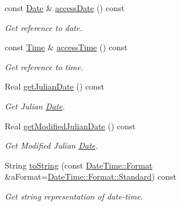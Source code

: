 \begin{DoxyCompactItemize}
const \hyperlink{classlibrary_1_1physics_1_1time_1_1_date}{Date} \& \hyperlink{classlibrary_1_1physics_1_1time_1_1_date_time_aa5042ece04c5b9accf745dbd26ecb0b4}{access\+Date} () const
\begin{DoxyCompactList}\small\item\em Get reference to date. \end{DoxyCompactList}\item 
const \hyperlink{classlibrary_1_1physics_1_1time_1_1_time}{Time} \& \hyperlink{classlibrary_1_1physics_1_1time_1_1_date_time_af3ba24f0db227e42120f022facb6e759}{access\+Time} () const
\begin{DoxyCompactList}\small\item\em Get reference to time. \end{DoxyCompactList}\item 
Real \hyperlink{classlibrary_1_1physics_1_1time_1_1_date_time_aea64945314a4dd75f0f8fd0fea9c5c33}{get\+Julian\+Date} () const
\begin{DoxyCompactList}\small\item\em Get Julian \hyperlink{classlibrary_1_1physics_1_1time_1_1_date}{Date}. \end{DoxyCompactList}\item 
Real \hyperlink{classlibrary_1_1physics_1_1time_1_1_date_time_a9c624dbbdd13c81d96f0492eae0d1e2f}{get\+Modified\+Julian\+Date} () const
\begin{DoxyCompactList}\small\item\em Get Modified Julian \hyperlink{classlibrary_1_1physics_1_1time_1_1_date}{Date}. \end{DoxyCompactList}\item 
String \hyperlink{classlibrary_1_1physics_1_1time_1_1_date_time_a6881a196eb787e0d5206005e31041e7e}{to\+String} (const \hyperlink{classlibrary_1_1physics_1_1time_1_1_date_time_a99e6afd988c9b091b1540d707922c804}{Date\+Time\+::\+Format} \&a\+Format=\hyperlink{classlibrary_1_1physics_1_1time_1_1_date_time_a99e6afd988c9b091b1540d707922c804aeb6d8ae6f20283755b339c0dc273988b}{Date\+Time\+::\+Format\+::\+Standard}) const
\begin{DoxyCompactList}\small\item\em Get string representation of date-\/time. \end{DoxyCompactList}\end{DoxyCompactItemize}
